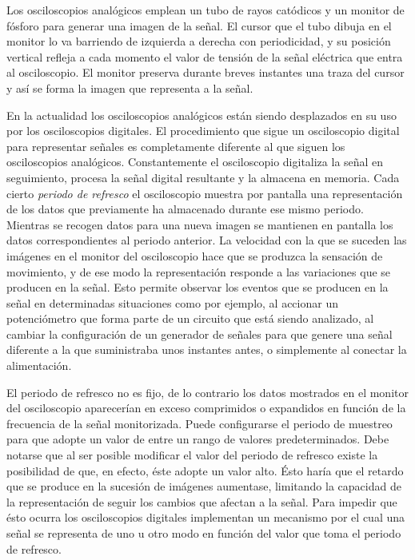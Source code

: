 Los osciloscopios analógicos emplean un tubo de rayos catódicos y un monitor de fósforo para generar una imagen de la señal. El cursor que el tubo dibuja en el monitor lo va barriendo de izquierda a derecha con periodicidad, y su posición vertical refleja a cada momento el valor de tensión de la señal eléctrica que entra al osciloscopio. El monitor preserva durante breves instantes una traza del cursor y así se forma la imagen que representa a la señal.\par
En la actualidad los osciloscopios analógicos están siendo desplazados en su uso por los osciloscopios digitales. El procedimiento que sigue un osciloscopio digital para representar señales es completamente diferente al que siguen los osciloscopios analógicos. Constantemente el osciloscopio digitaliza la señal en seguimiento, procesa la señal digital resultante y la almacena en memoria. Cada cierto \emph{periodo de refresco} el osciloscopio muestra por pantalla una representación de los datos que previamente ha almacenado durante ese mismo periodo. Mientras se recogen datos para una nueva imagen se mantienen en pantalla los datos correspondientes al periodo anterior. La velocidad con la que se suceden las imágenes en el monitor del osciloscopio hace que se produzca la sensación de movimiento, y de ese modo la representación responde a las variaciones que se producen en la señal. Esto permite observar los eventos que se producen en la señal en determinadas situaciones como por ejemplo, al accionar un potenciómetro que forma parte de un circuito que está siendo analizado, al cambiar la configuración de un generador de señales para que genere una señal diferente a la que suministraba unos instantes antes, o simplemente al conectar la alimentación.\par
El periodo de refresco no es fijo, de lo contrario los datos mostrados en el monitor del osciloscopio aparecerían en exceso comprimidos o expandidos en función de la frecuencia de la señal monitorizada. Puede configurarse el periodo de muestreo para que adopte un valor de entre un rango de valores predeterminados. Debe notarse que al ser posible modificar el valor del periodo de refresco existe la posibilidad de que, en efecto, éste adopte un valor alto. Ésto haría que el retardo que se produce en la sucesión de imágenes aumentase, limitando la capacidad de la representación de seguir los cambios que afectan a la señal. Para impedir que ésto ocurra los osciloscopios digitales implementan un mecanismo por el cual una señal se representa de uno u otro modo en función del valor que toma el periodo de refresco.

